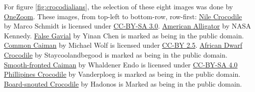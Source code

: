 For figure \ref{fig:crocodialians},
the selection of these eight images was done by 
\href{https://www.onezoom.org/life.html/@Crocodylia=195672\#x1602,y148,w4.1516}{OneZoom}.
These images, from top-left to bottom-row, row-first:
\href{http://media.eol.org/content/2018/04/11/13/61270_orig.jpg}{Nile Crocodile}
by Marco Schmidt
is licensed under \href{http://creativecommons.org/licenses/by-sa/3.0}{CC-BY-SA 3.0}.
\href{https://www.flickr.com/photos/nasakennedy/14159295507}{American Alligator}
by NASA Kennedy.
\href{http://media.eol.org/content/2014/10/06/10/58393_orig.jpg}{False Gavial}
by Yinan Chen
is marked as being in the public domain.
\href{http://media.eol.org/content/2012/06/13/05/87714_orig.jpg}{Common Caiman}
by Michael Wolf
is licensed under \href{http://creativecommons.org/licenses/by/2.5}{CC-BY 2.5}.
\href{http://media.eol.org/content/2013/06/11/03/12146_orig.jpg}{African Dwarf Crocodile}
by Staycoolandbegood
is marked as being in the public domain.
\href{http://media.eol.org/content/2013/11/25/21/58484_orig.jpg}{Smooth-fronted Caiman}
by Whaldener Endo
is licensed under \href{http://creativecommons.org/licenses/by-sa/4.0}{CC-BY-SA 4.0}
\href{http://media.eol.org/content/2013/06/11/03/06619_orig.jpg}{Phillipines Crocodile}
by Vanderploeg
is marked as being in the public domain.
\href{http://media.eol.org/content/2014/10/06/16/93746_orig.jpg}{Board-snouted Crocodile}
by Hadonos
is Marked as being in the public domain.
